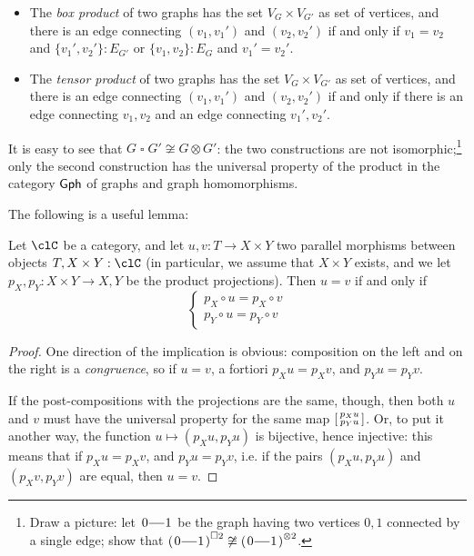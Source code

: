 \documentclass[11pt]{article}
\begin{document}
\begin{itemize}
	      \begin{itemize}
		      \item The \emph{box product} of two graphs has the set $V_G\times V_{G'}$ as set of vertices, and there is an edge connecting $(v_1,v_1')$ and $(v_2,v_2')$ if and only if $v_1=v_2$ and $\{v_1',v_2'\} :  E_{G'}$ or $\{v_1,v_2\} :  E_G$ and $v_1'=v_2'$.
		      \item The \emph{tensor product} of two graphs has the set $V_G\times V_{G'}$ as set of vertices, and there is an edge connecting $(v_1,v_1')$ and $(v_2,v_2')$ if and only if there is an edge connecting $v_1,v_2$ and an edge connecting $v_1',v_2'$.
	      \end{itemize}
	      It is easy to see that \(G \mathbin{\square} G'\not\cong G\otimes G'\): the two constructions are not isomorphic;\footnote{Draw a picture: let $\xymatrix@M=1pt@C=4mm{  0 \ar@{-}[r]& 1 }$ be the graph having two vertices $0,1$ connected by a single edge; show that $\left(\xymatrix@M=1pt@C=4mm{  0 \ar@{-}[r]& 1 }\right)^{\square 2} \not\cong \left(\xymatrix@M=1pt@C=4mm{  0 \ar@{-}[r]& 1 }\right)^{\otimes 2}$.} only the second construction has the universal property of the product in the category \({\sf Gph}\) of graphs and graph homomorphisms.
\end{itemize}
The following is a useful lemma:
\begin{lemma}
	Let $\clC$ be a category, and let $u,v : T \to X\times Y$ two parallel morphisms between objects $T, X\times Y : \clC$ (in particular, we assume that $X\times Y$ exists, and we let $p_X,p_Y : X\times Y\to X,Y$ be the product projections). Then $u=v$ if and only if
	\begin{equation*}
		\begin{cases}
			p_X \circ u = p_X \circ v \\
			p_Y \circ u = p_Y \circ v
		\end{cases}
	\end{equation*}
\end{lemma}
\begin{proof}
	One direction of the implication is obvious: composition on the left and on the right is a \emph{congruence}, so if $u=v$, a fortiori $p_Xu=p_Xv$, and $p_Yu=p_Yv$. 
	
	If the post-compositions with the projections are the same, though, then both $u$ and $v$ must have the universal property for the same map $\left[\begin{smallmatrix}p_Xu\\p_Yu\end{smallmatrix}\right]$. Or, to put it another way, the function $u\mapsto (p_Xu,p_Yu)$ is bijective, hence injective: this means that if $p_Xu=p_Xv$, and $p_Yu=p_Yv$, i.e. if the pairs $(p_Xu,p_Yu)$ and $(p_Xv,p_Yv)$ are equal, then $u=v$.
\end{proof}
\end{document}
